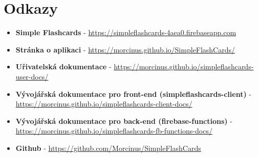 \documentclass[a4paper,12pt]{article}
\begin{document}
\section{Odkazy}
\begin{itemize}
\item \textbf{Simple Flashcards} - \href{https://simpleflashcards-4aea0.firebaseapp.com}{https://simpleflashcards-4aea0.firebaseapp.com}
\item \textbf{Stránka o aplikaci} - \href{https://morcinus.github.io/SimpleFlashCards/}{https://morcinus.github.io/SimpleFlashCards/}
\item \textbf{Uřivatelská dokumentace} - \href{https://morcinus.github.io/simpleflashcards-user-docs/}{https://morcinus.github.io/simpleflashcards-user-docs/}
\item \textbf{Vývojářská dokumentace pro front-end (simpleflashcards-client)} - \href{https://morcinus.github.io/simpleflashcards-client-docs/}{https://morcinus.github.io/simpleflashcards-client-docs/}
\item \textbf{Vývojářská dokumentace pro back-end (firebase-functions)} - \href{https://morcinus.github.io/simpleflashcards-fb-functions-docs/}{https://morcinus.github.io/simpleflashcards-fb-functions-docs/}
\item \textbf{Github} - \href{https://github.com/Morcinus/SimpleFlashCards}{https://github.com/Morcinus/SimpleFlashCards}
\end{itemize}
\end{document}
